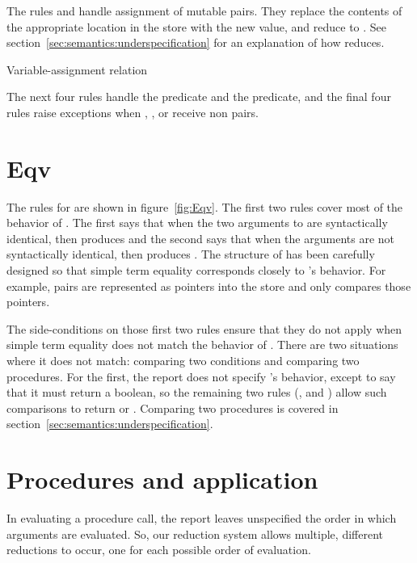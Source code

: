 The rules  and  handle assignment of mutable pairs.
They replace the contents of the appropriate location in the store with the new value, and reduce to . See section~\ref{sec:semantics:underspecification} for an explanation of how  reduces.

\beginfig
\subfigureadjust{}
\begin{center}

\end{center}
\caption{Variable-assignment relation}\label{fig:varsetd}
\endfig

The next four rules handle the  predicate and the  predicate, and the final four rules raise exceptions when , ,  or  receive non pairs.

\section{Eqv}

The rules for  are shown in figure~\ref{fig:Eqv}. The first two rules cover most of the behavior of .
The first says that when the two arguments to  are syntactically identical, then  produces \semtrue{} and the second says that when the arguments are not syntactically identical, then  produces \semfalse{}.
The structure of  has been carefully designed so that simple term equality corresponds closely to 's behavior.
For example, pairs are represented as pointers into the store and  only compares those pointers.

The side-conditions on those first two rules ensure that they do not apply when simple term equality does not match the behavior of . There are two situations where it does not match: comparing two conditions and comparing two procedures. For the first, the report does not specify 's behavior, except to say that it must return a boolean, so the remaining two rules (, and ) allow such comparisons to return \semtrue{} or \semfalse{}. Comparing two procedures is covered in section~\ref{sec:semantics:underspecification}.

\section{Procedures and application}

In evaluating a procedure call, the report leaves
unspecified the order in which arguments are evaluated. So, our reduction system allows multiple, different reductions to occur, one for each possible order of evaluation.

